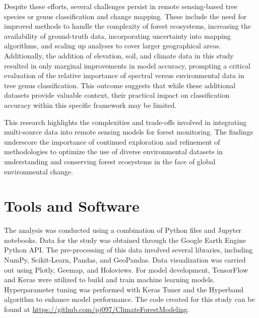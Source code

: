Despite these efforts, several challenges persist in remote sensing-based tree species or genus classification and change mapping. These include the need for improved methods to handle the complexity of forest ecosystems, increasing the availability of ground-truth data, incorporating uncertainty into mapping algorithms, and scaling up analyses to cover larger geographical areas. Additionally, the addition of elevation, soil, and climate data in this study resulted in only marginal improvements in model accuracy, prompting a critical evaluation of the relative importance of spectral versus environmental data in tree genus classification. This outcome suggests that while these additional datasets provide valuable context, their practical impact on classification accuracy within this specific framework may be limited.

This research highlights the complexities and trade-offs involved in integrating multi-source data into remote sensing models for forest monitoring. The findings underscore the importance of continued exploration and refinement of methodologies to optimize the use of diverse environmental datasets in understanding and conserving forest ecosystems in the face of global environmental change.

\section{Tools and Software}

The analysis was conducted using a combination of Python files and Jupyter notebooks. Data for the study was obtained through the Google Earth Engine Python API. The pre-processing of this data involved several libraries, including NumPy, Scikit-Learn, Pandas, and GeoPandas. Data visualization was carried out using Plotly, Geemap, and Holoviews. For model development, TensorFlow and Keras were utilized to build and train machine learning models. Hyperparameter tuning was performed with Keras Tuner and the Hyperband algorithm to enhance model performance. The code created for this study can be found at \url{https://github.com/pj097/ClimateForestModeling}.